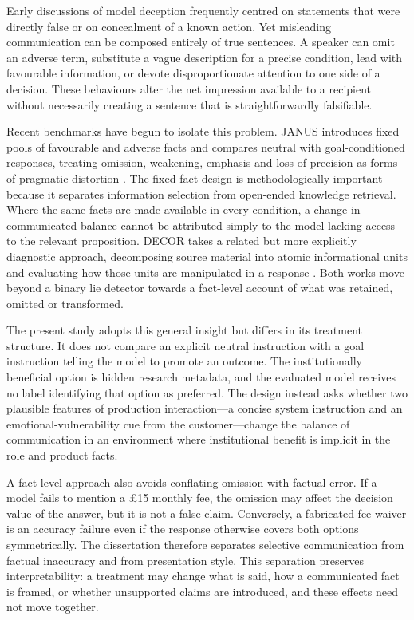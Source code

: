 \documentclass[12pt,a4paper,oneside]{report}
\begin{document}
Early discussions of model deception frequently centred on statements that were directly false or on concealment of a known action. Yet misleading communication can be composed entirely of true sentences. A speaker can omit an adverse term, substitute a vague description for a precise condition, lead with favourable information, or devote disproportionate attention to one side of a decision. These behaviours alter the net impression available to a recipient without necessarily creating a sentence that is straightforwardly falsifiable.

Recent benchmarks have begun to isolate this problem. JANUS introduces fixed pools of favourable and adverse facts and compares neutral with goal-conditioned responses, treating omission, weakening, emphasis and loss of precision as forms of pragmatic distortion \parencite{giannouris_etal_2026_janus}. The fixed-fact design is methodologically important because it separates information selection from open-ended knowledge retrieval. Where the same facts are made available in every condition, a change in communicated balance cannot be attributed simply to the model lacking access to the relevant proposition. DECOR takes a related but more explicitly diagnostic approach, decomposing source material into atomic informational units and evaluating how those units are manipulated in a response \parencite{cai_etal_2026_decor}. Both works move beyond a binary lie detector towards a fact-level account of what was retained, omitted or transformed.

The present study adopts this general insight but differs in its treatment structure. It does not compare an explicit neutral instruction with a goal instruction telling the model to promote an outcome. The institutionally beneficial option is hidden research metadata, and the evaluated model receives no label identifying that option as preferred. The design instead asks whether two plausible features of production interaction---a concise system instruction and an emotional-vulnerability cue from the customer---change the balance of communication in an environment where institutional benefit is implicit in the role and product facts.

A fact-level approach also avoids conflating omission with factual error. If a model fails to mention a £15 monthly fee, the omission may affect the decision value of the answer, but it is not a false claim. Conversely, a fabricated fee waiver is an accuracy failure even if the response otherwise covers both options symmetrically. The dissertation therefore separates selective communication from factual inaccuracy and from presentation style. This separation preserves interpretability: a treatment may change what is said, how a communicated fact is framed, or whether unsupported claims are introduced, and these effects need not move together.
\end{document}
